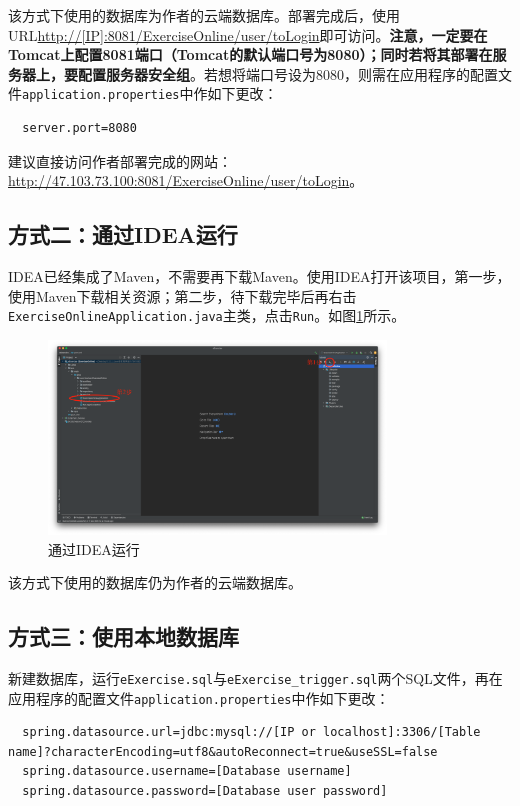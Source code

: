 \documentclass{nwafucoursepaper}
\begin{document}
该方式下使用的数据库为作者的云端数据库。部署完成后，使用URL\url{http://[IP]:8081/ExerciseOnline/user/toLogin}即可访问。\textbf{注意，一定要在Tomcat上配置8081端口（Tomcat的默认端口号为8080）；同时若将其部署在服务器上，要配置服务器安全组}。若想将端口号设为8080，则需在应用程序的配置文件\verb|application.properties|中作如下更改：
\begin{lstlisting}
  server.port=8080
\end{lstlisting}

建议直接访问作者部署完成的网站：\url{http://47.103.73.100:8081/ExerciseOnline/user/toLogin}。

\subsection{方式二：通过IDEA运行}

IDEA已经集成了Maven，不需要再下载Maven。使用IDEA打开该项目，第一步，使用Maven下载相关资源；第二步，待下载完毕后再右击\verb|ExerciseOnlineApplication.java|主类，点击\verb|Run|。如图\ref{idea_instruct}所示。
\begin{figure}[h]
  \centering
  \includegraphics[width=0.8\textwidth]{idea_instruct.png}
  \caption{通过IDEA运行}
  \label{idea_instruct}
\end{figure}

该方式下使用的数据库仍为作者的云端数据库。

\subsection{方式三：使用本地数据库}

新建数据库，运行\verb|eExercise.sql|与\verb|eExercise_trigger.sql|两个SQL文件，再在应用程序的配置文件\verb|application.properties|中作如下更改：
\begin{lstlisting}
  spring.datasource.url=jdbc:mysql://[IP or localhost]:3306/[Table name]?characterEncoding=utf8&autoReconnect=true&useSSL=false
  spring.datasource.username=[Database username]
  spring.datasource.password=[Database user password]
\end{lstlisting}
\end{document}
